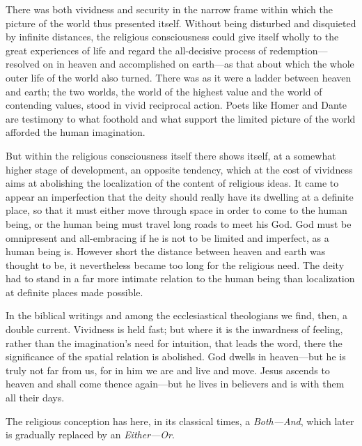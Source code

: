 \documentclass[12pt,a4paper]{book}
\newcommand{\opage}[1]{\marginnote{\footnotesize\textit{[#1]}}}
\begin{document}
There was both vividness and security in the narrow frame within which the
picture of the world thus presented itself. Without being disturbed and
disquieted by infinite distances, the religious consciousness could give
itself wholly to the great experiences of life and regard the all-decisive
process of redemption---resolved on in heaven and accomplished on
earth---as that about which the whole outer life of the world also turned.
There was as it were a ladder between heaven and earth; the two worlds, the
world of the highest value and the world of contending values, stood in
vivid reciprocal action. Poets like Homer and Dante are testimony to what
foothold and what support the limited picture of the world afforded the human
imagination.

But within the religious consciousness itself there shows itself, at a
somewhat higher stage of development, an opposite tendency, which at the cost
of vividness aims at abolishing the localization of the content of religious
ideas. It came to appear an imperfection that the deity should really have
its dwelling at a definite place, so that it must either move through space
in order to come to the human being, or the human being must travel long
roads to meet his God. God must be omnipresent and all-embracing if he is not
to be limited and imperfect, as a human being is. However short the distance
between heaven and earth was thought to be, it nevertheless became too long
for the religious need. The deity had to stand in a far more intimate 
\opage{26}relation to the human being than localization at definite places made possible.

In the biblical writings and among the ecclesiastical theologians we find,
then, a double current. Vividness is held fast; but where it is the
inwardness of feeling, rather than the imagination's need for intuition, that
leads the word, there the significance of the spatial relation is abolished.
God dwells in heaven---but he is truly not far from us, for in him we are and
live and move. Jesus ascends to heaven and shall come thence again---but he
lives in believers and is with them all their days.

The religious conception has here, in its classical times, a
\emph{Both---And}, which later is gradually replaced by an
\emph{Either---Or}.

\medskip
\end{document}

